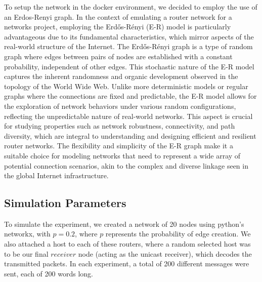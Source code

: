 To setup the network in the docker environment, we decided to employ the use of an
Erdos-Renyi graph.
In the context of emulating a router network for a networks project, employing the Erdős-Rényi (E-R) model is particularly advantageous due to its fundamental characteristics, which mirror aspects of the real-world structure of the Internet\cite{Li2021}. The Erdős-Rényi graph is a type of random graph where edges between pairs of nodes are established with a constant probability, independent of other edges. This stochastic nature of the E-R model captures the inherent randomness and organic development observed in the topology of the World Wide Web. Unlike more deterministic models or regular graphs where the connections are fixed and predictable, the E-R model allows for the exploration of network behaviors under various random configurations, reflecting the unpredictable nature of real-world networks. This aspect is crucial for studying properties such as network robustness, connectivity, and path diversity, which are integral to understanding and designing efficient and resilient router networks. The flexibility and simplicity of the E-R graph make it a suitable choice for modeling networks that need to represent a wide array of potential connection scenarios, akin to the complex and diverse linkage seen in the global Internet infrastructure.

\subsection{Simulation Parameters}

To simulate the experiment, we created a network of 20 nodes using python's networkx, with $p=0.2$, where $p$ represents the probability of edge creation. We also attached a host to each of these routers, where a random selected host was to be our
final $receiver$ node (acting as the unicast receiver), which decodes the transmitted packets. 
In each experiment, a total of 
200 different messages were sent, each of 200 words long. 







